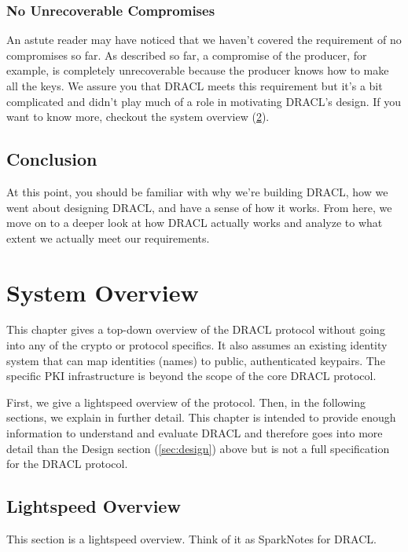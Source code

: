 \documentclass[pdftex,12pt,a4papaer,twoside,notitlepage]{report}
\begin{document}
\subsection{No Unrecoverable Compromises}

An astute reader may have noticed that we haven't covered the requirement of no
compromises so far. As described so far, a compromise of the producer, for
example, is completely unrecoverable because the producer knows how to make all
the keys. We assure you that DRACL meets this requirement but it's a bit
complicated and didn't play much of a role in motivating DRACL's design. If you
want to know more, checkout the system overview (\cref{chap:system-overview}).

\section{Conclusion}

At this point, you should be familiar with why we're building DRACL, how we went
about designing DRACL, and have a sense of how it works. From here, we move on
to a deeper look at how DRACL actually works and analyze to what extent we
actually meet our requirements.

\chapter{System Overview}
\label{chap:system-overview}

This chapter gives a top-down overview of the DRACL protocol without going into
any of the crypto or protocol specifics. It also assumes an existing identity
system that can map identities (names) to public, authenticated keypairs. The
specific PKI infrastructure is beyond the scope of the core DRACL protocol.

First, we give a lightspeed overview of the protocol. Then, in the following
sections, we explain in further detail. This chapter is intended to provide
enough information to understand and evaluate DRACL and therefore goes into more
detail than the Design section (\cref{sec:design}) above but is not a full
specification for the DRACL protocol.

\section{Lightspeed Overview}

This section is a lightspeed overview. Think of it as SparkNotes\texttrademark{}
for DRACL.
\end{document}
